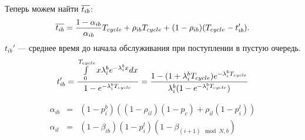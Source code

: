Теперь можем найти $\overline{t_{i b}}$:
\begin{equation}
\notag
\overline{t_{i b}} = \frac{1-\alpha_{ib}}{\alpha_{ib}} T_{cycle} + \rho_{ib} T_{cycle} + (1 - \rho_{ib}) (T_{cycle}-t_{ib}').
\end{equation}
$t_{ib}'$ --- среднее время до начала обслуживания при поступлении в пустую очередь.
\begin{equation}
t_{ib}' = \frac{\int\limits_{0}^{T_{cycle}} x\lambda^{b}_{i}e^{-\lambda^{b}_{i}x}dx}{1-e^{-\lambda^{b}_{i}T_{cycle}}} = \frac{1-(1+\lambda^{b}_{i}T_{cycle})e^{-\lambda^{b}_{i}T_{cycle}}}{\lambda^{b}_{i}(1-e^{-\lambda^{b}_{i}T_{cycle}})}
\end{equation}

\begin{eqnarray}
\alpha_{ib} & = & (1 - p_{i}^{b})((1-\rho_{il})(1-p_c)+\rho_{il}(1-p_{i}^l)) \\
\alpha_{il} & = & (1 - \beta_{ib})(1-p_i^l)(1-\beta_{{(i+1)\mod N},b}) \\
\end{eqnarray}

